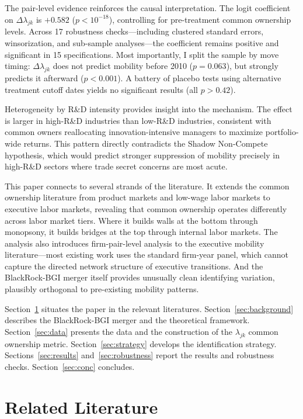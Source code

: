 \documentclass[11pt,a4paper]{article}
\begin{document}
The pair-level evidence reinforces the causal interpretation. The logit coefficient on $\Delta\lambda_{jk}$ is $+0.582$ ($p<10^{-18}$), controlling for pre-treatment common ownership levels. Across 17 robustness checks---including clustered standard errors, winsorization, and sub-sample analyses---the coefficient remains positive and significant in 15 specifications. Most importantly, I split the sample by move timing: $\Delta\lambda_{jk}$ does not predict mobility before 2010 ($p=0.063$), but strongly predicts it afterward ($p<0.001$). A battery of placebo tests using alternative treatment cutoff dates yields no significant results (all $p>0.42$).

Heterogeneity by R\&D intensity provides insight into the mechanism. The effect is larger in high-R\&D industries than low-R\&D industries, consistent with common owners reallocating innovation-intensive managers to maximize portfolio-wide returns. This pattern directly contradicts the Shadow Non-Compete hypothesis, which would predict stronger suppression of mobility precisely in high-R\&D sectors where trade secret concerns are most acute.

This paper connects to several strands of the literature. It extends the common ownership literature from product markets \cite{azar2018,azar2018b} and low-wage labor markets \cite{azar2022} to executive labor markets, revealing that common ownership operates differently across labor market tiers. Where it builds walls at the bottom through monopsony, it builds bridges at the top through internal labor markets. The analysis also introduces firm-pair-level analysis to the executive mobility literature---most existing work uses the standard firm-year panel, which cannot capture the directed network structure of executive transitions. And the BlackRock-BGI merger itself provides unusually clean identifying variation, plausibly orthogonal to pre-existing mobility patterns.

Section~\ref{sec:lit} situates the paper in the relevant literatures. Section~\ref{sec:background} describes the BlackRock-BGI merger and the theoretical framework. Section~\ref{sec:data} presents the data and the construction of the $\lambda_{jk}$ common ownership metric. Section~\ref{sec:strategy} develops the identification strategy. Sections~\ref{sec:results} and~\ref{sec:robustness} report the results and robustness checks. Section~\ref{sec:conc} concludes.

\section{Related Literature}
\label{sec:lit}
\end{document}
